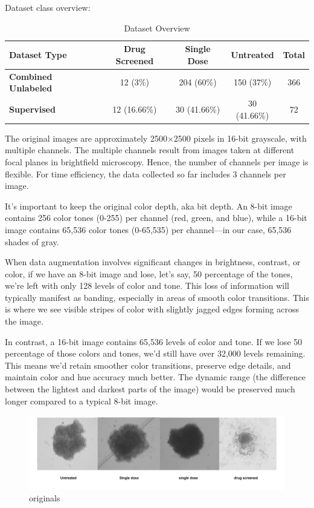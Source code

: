\documentclass[12pt,twoside,a4paper,parskip]{scrbook} %
\begin{document}
Dataset class overview:
\begin{table}[ht!]
  \centering
  \begin{tabular}{|l|c|c|c|c|}
  \hline
  \textbf{Dataset Type} & \textbf{Drug Screened} & \textbf{Single Dose} & \textbf{Untreated} & \textbf{Total} \\ \hline
  \textbf{Combined Unlabeled} & 12 (3\%) & 204 (60\%) & 150 (37\%) & 366 \\ \hline
  \textbf{Supervised}         & 12 (16.66\%) & 30 (41.66\%)  & 30 (41.66\%) & 72  \\ \hline
  \end{tabular}
  \caption{Dataset Overview}
  \label{tab:dataset}
  \end{table}

The original images are approximately 2500×2500 pixels in 16-bit grayscale, with multiple channels. The multiple channels result from images taken at different focal planes in brightfield microscopy. Hence, the number of channels per image is flexible. For time efficiency, the data collected so far includes 3 channels per image.

It’s important to keep the original color depth, aka bit depth. An 8-bit image contains 256 color tones (0-255) per channel (red, green, and blue), while a 16-bit image contains 65,536 color tones (0-65,535) per channel—in our case, 65,536 shades of gray.

When data augmentation involves significant changes in brightness, contrast, or color, if we have an 8-bit image and lose, let’s say, 50 percentage of the tones, we’re left with only 128 levels of color and tone. This loss of information will typically manifest as banding, especially in areas of smooth color transitions. This is where we see visible stripes of color with slightly jagged edges forming across the image.

In contrast, a 16-bit image contains 65,536 levels of color and tone. If we lose 50 percentage of those colors and tones, we’d still have over 32,000 levels remaining. This means we’d retain smoother color transitions, preserve edge details, and maintain color and hue accuracy much better. The dynamic range (the difference between the lightest and darkest parts of the image) would be preserved much longer compared to a typical 8-bit image.

\begin{figure}[H]
  \centering
  \includegraphics[scale=0.8]{figures/originals.pdf} 
  \caption{originals}
  \label{fig:originals}
\end{figure}
\end{document}
